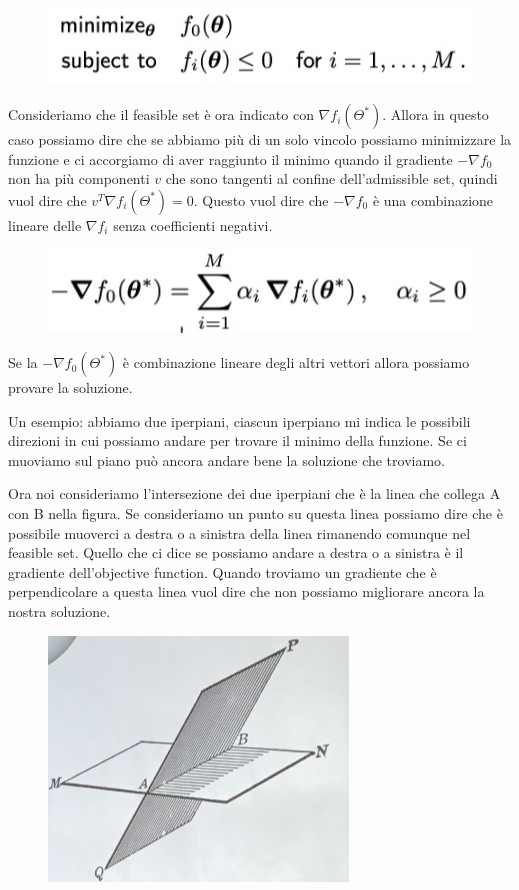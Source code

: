 \documentclass[14pt]{extreport}
\begin{document}
\begin{figure}[H]
\centering
\includegraphics[width=0.5\linewidth]{295.jpeg}
\end{figure}

Consideriamo che il feasible set è ora indicato con $\nabla f_i(\Theta^*)$. Allora in questo caso possiamo dire che se abbiamo più di un solo vincolo
possiamo minimizzare la funzione e ci accorgiamo di aver raggiunto il minimo quando il gradiente $-\nabla f_0$ non ha più componenti $v$ che sono
tangenti al confine dell'admissible set, quindi vuol dire che $v^T\nabla f_i(\Theta^*) = 0$. Questo vuol dire che $-\nabla f_0$ è una combinazione
lineare delle $\nabla f_i$ senza coefficienti negativi.

\begin{figure}[H]
\centering
\includegraphics[width=0.6\linewidth]{296.jpeg}
\end{figure}

Se la $-\nabla f_0(\Theta^*)$ è combinazione lineare degli altri vettori allora possiamo provare la soluzione.

Un esempio: abbiamo due iperpiani, ciascun iperpiano mi indica le possibili direzioni in cui possiamo andare per trovare il minimo della funzione. Se
ci muoviamo sul piano può ancora andare bene la soluzione che troviamo.

Ora noi consideriamo l'intersezione dei due iperpiani che è la linea che collega A con B nella figura. Se consideriamo un punto su questa linea
possiamo dire che è possibile muoverci a destra o a sinistra della linea rimanendo comunque nel feasible set. Quello che ci dice se possiamo andare a
destra o a sinistra è il gradiente dell'objective function. Quando troviamo un gradiente che è perpendicolare a questa linea vuol dire che non possiamo
migliorare ancora la nostra soluzione.
\begin{figure}[H]
\centering
\includegraphics[width=0.6\linewidth]{298.jpeg}
\end{figure}
\end{document}
